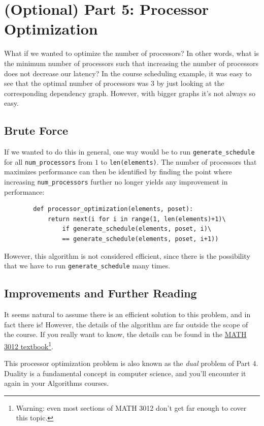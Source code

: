 \documentclass{article}
\begin{document}
    \section*{(Optional) Part 5: Processor Optimization}
    What if we wanted to optimize the number of processors? In other words, what is the minimum number of processors such that increasing the number of processors does not decrease our latency? In the course scheduling example, it was easy to see that the optimal number of processors was $3$ by just looking at the corresponding dependency graph. However, with bigger graphs it's not always so easy.
    
    \subsection*{Brute Force}
    If we wanted to do this in general, one way would be to run \lstinline{generate_schedule} for all \lstinline{num_processors} from $1$ to \lstinline{len(elements)}. The number of processors that maximizes performance can then be identified by finding the point where increasing \lstinline{num_processors} further no longer yields any improvement in performance:
    
    \begin{lstlisting}
        def processor_optimization(elements, poset):
            return next(i for i in range(1, len(elements)+1)\
                if generate_schedule(elements, poset, i)\
                == generate_schedule(elements, poset, i+1))
    \end{lstlisting}
    
    However, this algorithm is not considered efficient, since there is the possibility that we have to run \lstinline{generate_schedule} many times. 

    \subsection*{Improvements and Further Reading}
    It seems natural to assume there is an efficient solution to this problem, and in fact there is! However, the details of the algorithm are far outside the scope of the course. If you really want to know, the details can be found in the \href{https://www.appliedcombinatorics.org/book/s_flowapplications_chain-partition.html}{MATH 3012 textbook}\footnote{Warning: even most sections of MATH 3012 don't get far enough to cover this topic.}.
    
    \vspace{3mm} This processor optimization problem is also known as the \textit{dual} problem of Part 4. Duality is a fundamental concept in computer science, and you'll encounter it again in your Algorithms courses.
\end{document}
